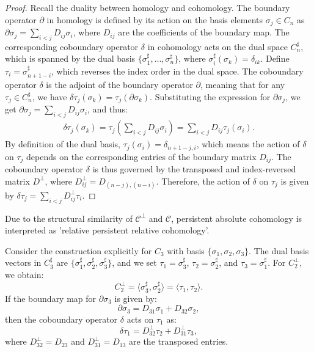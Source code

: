 \begin{proof}
Recall the duality between homology and cohomology. The boundary operator \( \partial \) in homology is defined by its action on the basis elements \( \sigma_j \in C_n \) as $\partial \sigma_j = \sum_{i < j} D_{ij} \sigma_i$, where \( D_{ij} \) are the coefficients of the boundary map. The corresponding coboundary operator \( \delta \) in cohomology acts on the dual space \( C_n^\sharp \), which is spanned by the dual basis \( \{\sigma_1^\sharp, \ldots, \sigma_n^\sharp\} \), where \( \sigma_i^\sharp(\sigma_k) = \delta_{ik} \). Define \( \tau_i = \sigma^\sharp_{n+1-i} \), which reverses the index order in the dual space. The coboundary operator \( \delta \) is the adjoint of the boundary operator \( \partial \), meaning that for any \( \tau_j \in C_n^\sharp \), we have $\delta \tau_j (\sigma_k) = \tau_j(\partial \sigma_k)$. Substituting the expression for \( \partial \sigma_j \), we get $\partial \sigma_j = \sum_{i < j} D_{ij} \sigma_i$, and thus:
\begin{align}
\delta \tau_j (\sigma_k) = \tau_j\left( \sum_{i < j} D_{ij} \sigma_i \right) = \sum_{i < j} D_{ij} \tau_j(\sigma_i).
\end{align}
By definition of the dual basis, \( \tau_j(\sigma_i) = \delta_{n+1-j,i} \), which means the action of \( \delta \) on \( \tau_j \) depends on the corresponding entries of the boundary matrix \( D_{ij} \). The coboundary operator \( \delta \) is thus governed by the transposed and index-reversed matrix \( D^\perp \), where $D_{ij}^\perp = D_{(n-j),(n-i)}$. Therefore, the action of \( \delta \) on \( \tau_j \) is given by $\delta \tau_j = \sum_{i < j} D_{ij}^\perp \tau_i$. \end{proof}

\begin{remark}{\cite[\S 2.7]{de2011dualities}}
Due to the structural similarity of \( \mathcal{C}^\perp \) and \( \mathcal{C} \), persistent absolute cohomology is interpreted as 'relative persistent relative cohomology'.
\end{remark}

\begin{example}
\label{chaincomplexcohomology}
Consider the construction explicitly for \( C_3 \) with basis \( \{\sigma_1, \sigma_2, \sigma_3\} \). The dual basis vectors in \( C_3^\sharp \) are \( \{\sigma_1^\sharp, \sigma_2^\sharp, \sigma_3^\sharp\} \), and we set \( \tau_1 = \sigma_3^\sharp \), \( \tau_2 = \sigma_2^\sharp \), and \( \tau_3 = \sigma_1^\sharp \). For \( C_2^\perp \), we obtain:
\[
	C_2^\perp = \langle \sigma_3^\sharp, \sigma_2^\sharp \rangle = \langle \tau_1, \tau_2 \rangle.
\]
If the boundary map for \( \partial \sigma_3 \) is given by:
\[
	\partial \sigma_3 = D_{31} \sigma_1 + D_{32} \sigma_2,
\]
then the coboundary operator \( \delta \) acts on \( \tau_1 \) as:
\[
	\delta \tau_1 = D_{32}^\perp \tau_2 + D_{31}^\perp \tau_3,
\]
where \( D_{32}^\perp = D_{23} \) and \( D_{31}^\perp = D_{13} \) are the transposed entries.
\end{example}

